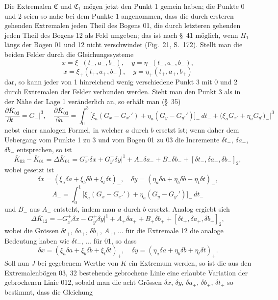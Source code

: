 \documentclass[11pt,a4paper,leqno]{article}
\begin{document}
Die Extremalen $\mathfrak{C}$ und $\mathfrak{C}_1$ mögen jetzt den Punkt 1 gemein haben; die Punkte 0 und 2 seien so nahe bei dem Punkte 1 angenommen, dass die durch ersteren gehenden Extremalen jeden Theil des Bogens 01, die durch letzteren gehenden jeden Theil des Bogens 12 als Feld umgeben; das ist nach \S~41 möglich, wenn $H_1$ längs der Bögen 01 und 12 nicht verschwindet (Fig.~21, S.~172). Stellt man die beiden Felder durch die Gleichungssysteme
\[
 x=\xi_-(t_-,a_-,b_-),\quad y=\eta_-(t_-,a_-,b_-),
\]
\[
 x=\xi_+(t_+,a_+,b_+),\quad y=\eta_+(t_+,a_+,b_+)
\]
dar, so kann jeder von 1 hinreichend wenig verschiedene Punkt 3 mit 0 und 2 durch Extremalen der Felder verbunden werden. Sieht man den Punkt 3 als in der Nähe der Lage 1 veränderlich an, so erhält man (\S~35)
\begin{equation}\tag{10}
\frac{\partial\overline K_{03}}{\partial t_-}=G_-\bigg|^3,
\quad
\frac{\partial\overline K_{03}}{\partial a_-}
=\int_0^3\bigl[\xi_a(G_x-G_{x'}')+\eta_a(G_y-G_{y'}')\bigr]_-\,dt_-
+\bigl(\xi_aG_{x'}+\eta_aG_{y'}\bigr)_-\bigg|^3
\end{equation}
nebst einer analogen Formel, in welcher $a$ durch $b$ ersetzt ist; wenn daher dem Uebergang vom Punkte 1 zu 3 und vom Bogen 01 zu 03 die Incremente $\delta t_-$, $\delta a_-$, $\delta b_-$ entsprechen, so ist
\[
\overline K_{03}-\overline K_{01}=\Delta\overline K_{01}
=G_{x'}^-\delta x+G_{y'}^-\delta y\bigg|^1
+A_-\delta a_-+B_-\delta b_-+[\delta t_-,\delta a_-,\delta b_-]_2,
\]
wobei gesetzt ist
\begin{equation}\tag{11}
\delta x=(\xi_a\delta a+\xi_b\delta b+\xi_t\delta t)_-,
\quad
\delta y=(\eta_a\delta a+\eta_b\delta b+\eta_t\delta t)_-,
\end{equation}
\[
A_- =\int_0^1\bigl[\xi_a(G_x-G_{x'}')+\eta_a(G_y-G_{y'}')\bigr]_-\,dt_-
\]
und $B_-$ aus $A_-$ entsteht, indem man $a$ durch $b$ ersetzt. Analog ergiebt sich
\[
\Delta\overline K_{12}
=-G_{x'}^+\delta x-G_{y'}^+\delta y\bigg|^1
+A_+\delta a_+ +B_+\delta b_+ +[\delta t_+,\delta a_+,\delta b_+]_2,
\]
wobei die Grössen $\delta t_+$, $\delta a_+$, $\delta b_+$, $A_+$, $\ldots$ für die Extremale 12 die analoge Bedeutung haben wie $\delta t_-$, $\ldots$ für 01, so dass
\begin{equation}\tag{12}
\delta x=(\xi_a\delta a+\xi_b\delta b+\xi_t\delta t)_+,
\quad
\delta y=(\eta_a\delta a+\eta_b\delta b+\eta_t\delta t)_+.
\end{equation}
Soll nun $J$ bei gegebenem Werthe von $K$ ein Extremum werden, so ist die aus den Extremalenbögen 03, 32 bestehende gebrochene Linie eine erlaubte Variation der gebrochenen Linie 012, sobald man die acht Grössen $\delta x$, $\delta y$, $\delta a_\pm$, $\delta b_\pm$, $\delta t_\pm$ so bestimmt, dass die Gleichung
\end{document}
